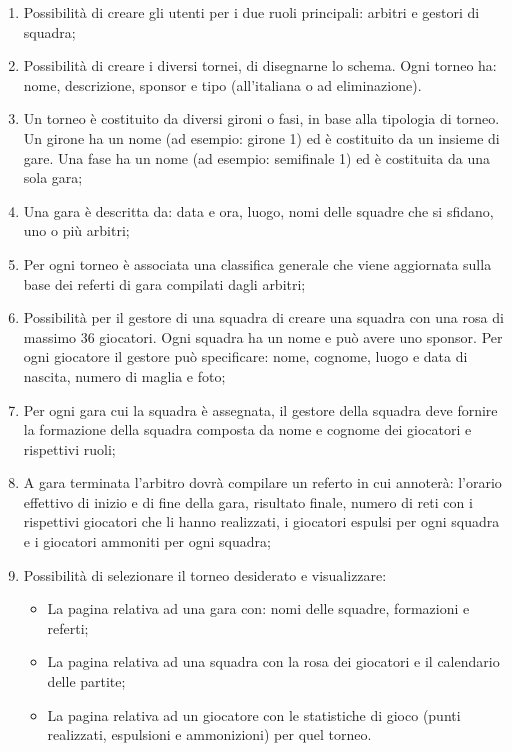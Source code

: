 \begin{enumerate}
	
	\item
	\label{sf-uadmin}
	Possibilità di creare gli utenti per i due ruoli principali: arbitri e gestori di squadra;
	
	\item
	Possibilità di creare i diversi tornei, di disegnarne lo schema. Ogni torneo ha: nome, descrizione, sponsor e tipo (all'italiana o ad eliminazione).
	
	\item
	Un torneo è costituito da diversi gironi o fasi, in base alla tipologia di torneo. Un girone ha un nome (ad esempio: girone 1) ed è costituito da un insieme di gare. Una fase ha un nome (ad esempio: semifinale 1) ed è costituita da una sola gara;
	
	\item
	Una gara è descritta da: data e ora, luogo, nomi delle squadre che si sfidano, uno o più arbitri;
	
	\item
	\label{ef-uadmin}
	Per ogni torneo è associata una classifica generale che viene aggiornata sulla base dei referti di gara compilati dagli arbitri;
	
	\item
	\label{sf-ugestore}
	Possibilità per il gestore di una squadra di creare una squadra con una rosa di massimo 36 giocatori. Ogni squadra ha un nome e può avere uno sponsor. Per ogni giocatore il gestore può specificare: nome, cognome, luogo e data di nascita, numero di maglia e foto;
	
	\item
	\label{ef-ugestore}
	Per ogni gara cui la squadra è assegnata, il gestore della squadra deve fornire la formazione della squadra composta da nome e cognome dei giocatori e rispettivi ruoli;
	
	\item
	\label{f-uarbitro}
	A gara terminata l'arbitro dovrà compilare un referto in cui annoterà: l'orario effettivo di inizio e di fine della gara, risultato finale, numero di reti con i rispettivi giocatori che li hanno realizzati,  i giocatori espulsi per ogni squadra e i giocatori ammoniti per ogni squadra;
	
	\item
	\label{f-upubblico}
	Possibilità di selezionare il torneo desiderato e visualizzare:
	
	\begin{itemize}
		\item
		La pagina relativa ad una gara con: nomi delle squadre, formazioni e referti;
		
		\item
		La pagina relativa ad una squadra con la rosa dei giocatori e il calendario delle partite;
		
		\item
		La pagina relativa ad un giocatore con le statistiche di gioco (punti realizzati, espulsioni e ammonizioni) per quel torneo.
	\end{itemize}

\end{enumerate}

